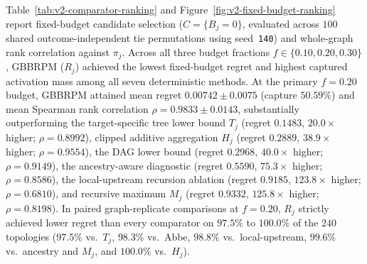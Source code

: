 Table~\ref{tab:v2-comparator-ranking} and
Figure~\ref{fig:v2-fixed-budget-ranking} report fixed-budget candidate
selection ($C = \{B_j = 0\}$, evaluated across $100$ shared
outcome-independent tie permutations using seed~\texttt{140}) and
whole-graph rank correlation against $\pi_j$. Across all three budget
fractions $f \in \{0.10, 0.20, 0.30\}$, GBBRPM ($R_j$) achieved the
lowest fixed-budget regret and highest captured activation mass among
all seven deterministic methods. At the primary $f=0.20$ budget,
GBBRPM attained mean regret $0.00742 \pm 0.0075$ (capture $50.59\%$)
and mean Spearman rank correlation $\rho = 0.9833 \pm 0.0143$,
substantially outperforming the target-specific tree lower bound $T_j$
(regret $0.1483$, $20.0\times$ higher; $\rho = 0.8992$), clipped
additive aggregation $H_j$ (regret $0.2889$, $38.9\times$ higher;
$\rho = 0.9554$), the \citet{abbe2020} DAG lower bound (regret
$0.2968$, $40.0\times$ higher; $\rho = 0.9149$), the ancestry-aware
diagnostic (regret $0.5590$, $75.3\times$ higher; $\rho = 0.8586$),
the local-upstream recursion ablation (regret $0.9185$, $123.8\times$
higher; $\rho = 0.6810$), and recursive maximum $M_j$ (regret $0.9332$,
$125.8\times$ higher; $\rho = 0.8198$). In paired graph-replicate
comparisons at $f=0.20$, $R_j$ strictly achieved lower regret than
every comparator on $97.5\%$ to $100.0\%$ of the $240$ topologies
($97.5\%$ vs.\ $T_j$, $98.3\%$ vs.\ Abbe, $98.8\%$ vs.\ local-upstream,
$99.6\%$ vs.\ ancestry and $M_j$, and $100.0\%$ vs.\ $H_j$).

